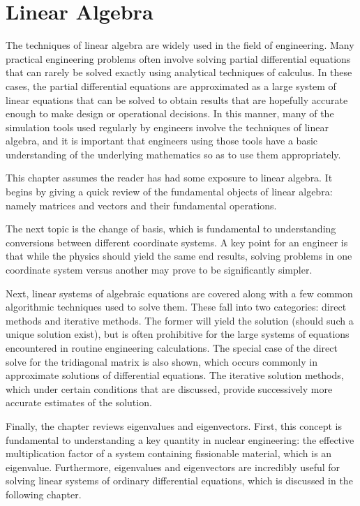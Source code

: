 \chapter{Linear Algebra} \label{Sec:linearAlgebra}

The techniques of linear algebra are widely used in the field of engineering. Many practical engineering problems often involve solving partial differential equations that can rarely be solved exactly using analytical techniques of calculus. In these cases, the partial differential equations are approximated as a large system of linear equations that can be solved to obtain results that are hopefully accurate enough to make design or operational decisions. In this manner, many of the simulation tools used regularly by engineers involve the techniques of linear algebra, and it is important that engineers using those tools have a basic understanding of the underlying mathematics so as to use them appropriately.

This chapter assumes the reader has had some exposure to linear algebra. It begins by giving a quick review of the fundamental objects of linear algebra: namely matrices and vectors and their fundamental operations. 

The next topic is the change of basis, which is fundamental to understanding conversions between different coordinate systems. A key point for an engineer is that while the physics should yield the same end results, solving problems in one coordinate system versus another may prove to be significantly simpler. 

Next, linear systems of algebraic equations are covered along with a few common algorithmic techniques used to solve them. These fall into two categories: direct methods and iterative methods. The former will yield the solution (should such a unique solution exist), but is often prohibitive for the large systems of equations encountered in routine engineering calculations. The special case of the direct solve for the tridiagonal matrix is also shown, which occurs commonly in approximate solutions of differential equations. The iterative solution methods, which under certain conditions that are discussed, provide successively more accurate estimates of the solution.

Finally, the chapter reviews eigenvalues and eigenvectors. First, this concept is fundamental to understanding a key quantity in nuclear engineering: the effective multiplication factor of a system containing fissionable material, which is an eigenvalue. Furthermore, eigenvalues and eigenvectors are incredibly useful for solving linear systems of ordinary differential equations, which is discussed in the following chapter.


